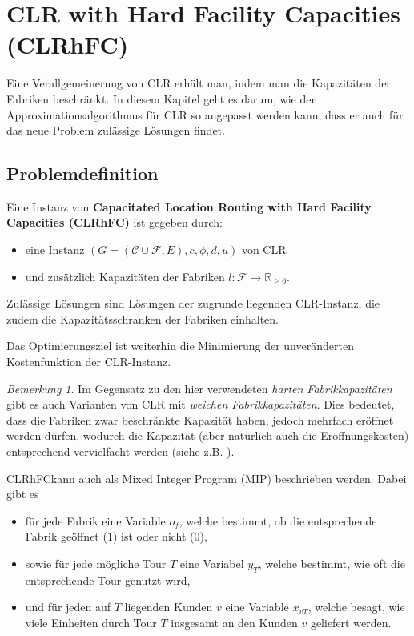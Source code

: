 \documentclass[a4paper,ngerman,11pt,bibtotoc]{scrartcl}
\theoremstyle{definition}
\theoremstyle{plain}
\theoremstyle{remark}
\newtheorem{bem}[defn]{Bemerkung}
\newcommand{\IR}{\mathbb{R}}
\newcommand{\ClientSet}{\mathscr{C}}
\newcommand{\FacilitySet}{\mathscr{F}}
\newcommand{\CLR}{CLR}
\newcommand{\CLRHFC}{CLRhFC}
\begin{document}
\section{\CLR{} with Hard Facility Capacities (\CLRHFC)}

Eine Verallgemeinerung von \CLR{} erhält man, indem man die Kapazitäten der Fabriken beschränkt. In diesem Kapitel geht es darum, wie der Approximationsalgorithmus für \CLR{} so angepasst werden kann, dass er auch für das neue Problem zulässige Lösungen findet.

	\subsection{Problemdefinition}\label{sec:CLRHFC-Def}

Eine Instanz von \textbf{Capacitated Location Routing with Hard Facility Capacities (\CLRHFC)} ist gegeben durch:
\begin{itemize}
	\item eine Instanz $(G=(\ClientSet\cup\FacilitySet,E), c,\phi,d,u)$ von \CLR
	\item und zusätzlich Kapazitäten der Fabriken $l: \FacilitySet \to \IR_{\geq 0}$.
\end{itemize}
Zulässige Lösungen sind Lösungen der zugrunde liegenden \CLR-Instanz, die zudem die Kapazitätsschranken der Fabriken einhalten.

Das Optimierungsziel ist weiterhin die Minimierung der unveränderten Kostenfunktion der \CLR-Instanz.

\begin{bem}
Im Gegensatz zu den hier verwendeten \emph{harten Fabrikkapazitäten} gibt es auch Varianten von \CLR{} mit \emph{weichen Fabrikkapazitäten}. Dies bedeutet, dass die Fabriken zwar beschränkte Kapazität haben, jedoch mehrfach eröffnet werden dürfen, wodurch die Kapazität (aber natürlich auch die Eröffnungskosten) entsprechend vervielfacht werden (siehe z.B. \cite{SoftCap1}).  
\end{bem}

\CLRHFC kann auch als Mixed Integer Program (MIP) beschrieben werden. Dabei gibt es
\begin{itemize}
	\item für jede Fabrik eine Variable $o_f$, welche bestimmt, ob die entsprechende Fabrik geöffnet ($1$) ist oder nicht ($0$),
	\item sowie für jede mögliche Tour $T$ eine Variabel $y_T$, welche bestimmt, wie oft die entsprechende Tour genutzt wird,
	\item und für jeden auf $T$ liegenden Kunden $v$ eine Variable $x_{vT}$, welche besagt, wie viele Einheiten durch Tour $T$ insgesamt an den Kunden $v$ geliefert werden.
\end{itemize}
\end{document}
